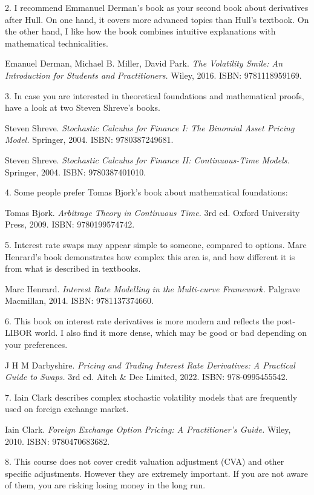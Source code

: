 \documentclass[a4paper,14pt]{extarticle}
\begin{document}
2. I recommend Emmanuel Derman’s book as your second book about derivatives after Hull. On
one hand, it covers more advanced topics than Hull’s textbook. On the other hand, I like how the
book combines intuitive explanations with mathematical technicalities.

Emanuel Derman, Michael B. Miller, David Park. \textit{The Volatility Smile: An Introduction for Students
and Practitioners.} Wiley, 2016. ISBN: 9781118959169.

3. In case you are interested in theoretical foundations and mathematical proofs, have a look at
two Steven Shreve’s books.

Steven Shreve. \textit{Stochastic Calculus for Finance I: The Binomial Asset Pricing Model.} Springer, 2004.
ISBN: 9780387249681.

Steven Shreve. \textit{Stochastic Calculus for Finance II: Continuous-Time Models.} Springer, 2004. ISBN:
9780387401010.

4. Some people prefer Tomas Bjork’s book about mathematical foundations:

Tomas Bjork. \textit{Arbitrage Theory in Continuous Time.} 3rd ed. Oxford University Press, 2009. ISBN:
9780199574742.

5. Interest rate swaps may appear simple to someone, compared to options. Marc Henrard’s
book demonstrates how complex this area is, and how different it is from what is described in
textbooks.

Marc Henrard. \textit{Interest Rate Modelling in the Multi-curve Framework.} Palgrave Macmillan, 2014.
ISBN: 9781137374660.

6. This book on interest rate derivatives is more modern and reflects the post-LIBOR world. I also find it more dense, which may be good or bad depending on your preferences.

J H M Darbyshire. \textit{Pricing and Trading Interest Rate Derivatives: A Practical Guide to Swaps.} 3rd ed. Aitch \& Dee Limited, 2022. ISBN: 978-0995455542.

7. Iain Clark describes complex stochastic volatility models that are frequently used on foreign
exchange market.

Iain Clark. \textit{Foreign Exchange Option Pricing: A Practitioner's Guide.} Wiley, 2010. ISBN: 9780470683682.

8. This course does not cover credit valuation adjustment (CVA) and other specific adjustments.
However they are extremely important. If you are not aware of them, you are risking losing
money in the long run.
\end{document}
